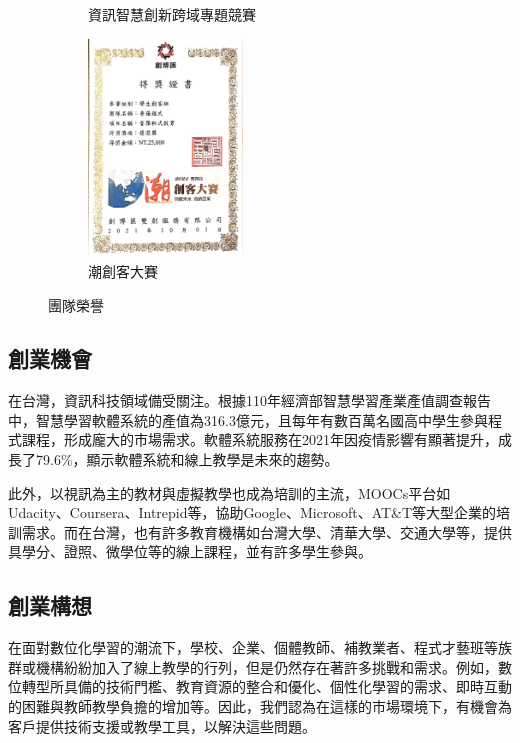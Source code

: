 \begin{figure}[H]
\begin{subfigure}{0.31\linewidth}
    \caption{資訊智慧創新跨域專題競賽}
    \label{fig:Awards-1}
  \end{subfigure}
  \begin{subfigure}{0.31\linewidth}
    \centering
    \includegraphics[width=0.45\textwidth]{images/創博匯.jpg}
    \caption{潮創客大賽}
    \label{fig:Awards-2}
  \end{subfigure}
  \caption{團隊榮譽}
\end{figure}

\subsection{創業機會}
在台灣，資訊科技領域備受關注。根據110年經濟部智慧學習產業產值調查報告\cite{ref:110產業產值調查報告}中，智慧學習軟體系統的產值為316.3億元，且每年有數百萬名國高中學生參與程式課程\cite{ref:學生數量}，形成龐大的市場需求。軟體系統服務在2021年因疫情影響有顯著提升，成長了79.6\%，顯示軟體系統和線上教學是未來的趨勢。

此外，以視訊為主的教材與虛擬教學也成為培訓的主流\cite{ref:企業培訓}，MOOCs平台如Udacity、Coursera、Intrepid等，協助Google、Microsoft、AT\&T等大型企業的培訓需求。而在台灣，也有許多教育機構如台灣大學、清華大學、交通大學等，提供具學分、證照、微學位等的線上課程，並有許多學生參與。

\subsection{創業構想}

在面對數位化學習的潮流下，學校、企業、個體教師、補教業者、程式才藝班等族群或機構紛紛加入了線上教學的行列，但是仍然存在著許多挑戰和需求\cite{ref:110產業產值調查報告}\cite{ref:111產業產值調查報告}。例如，數位轉型所具備的技術門檻、教育資源的整合和優化、個性化學習的需求、即時互動的困難與教師教學負擔的增加\cite{ref:老師的困難}等。因此，我們認為在這樣的市場環境下，有機會為客戶提供技術支援或教學工具，以解決這些問題。

